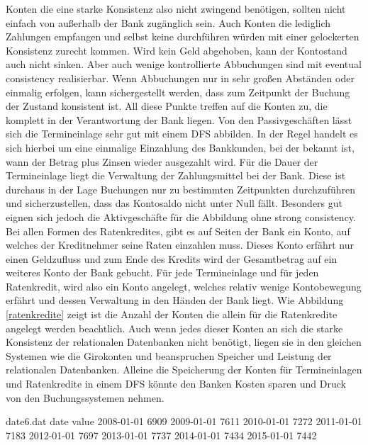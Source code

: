 \documentclass[12pt,oneside,a4paper,parskip]{scrbook}
\begin{document}
Konten die eine starke Konsistenz also nicht zwingend benötigen, sollten nicht einfach von außerhalb der Bank zugänglich sein. Auch Konten die lediglich Zahlungen empfangen und selbst keine durchführen würden mit einer gelockerten Konsistenz zurecht kommen. Wird kein Geld abgehoben, kann der Kontostand auch nicht sinken. Aber auch wenige kontrollierte Abbuchungen sind mit eventual consistency realisierbar. Wenn Abbuchungen nur in sehr großen Abständen oder einmalig erfolgen, kann sichergestellt werden, dass zum Zeitpunkt der Buchung der Zustand konsistent ist. All diese Punkte treffen auf die Konten zu, die komplett in der Verantwortung der Bank liegen. Von den Passivgeschäften lässt sich die Termineinlage sehr gut mit einem DFS abbilden. In der Regel handelt es sich hierbei um eine einmalige Einzahlung des Bankkunden, bei der bekannt ist, wann der Betrag plus Zinsen wieder ausgezahlt wird. Für die Dauer der Termineinlage liegt die Verwaltung der Zahlungsmittel bei der Bank. Diese ist durchaus in der Lage Buchungen nur zu bestimmten Zeitpunkten durchzuführen und sicherzustellen, dass das Kontosaldo nicht unter Null fällt. Besonders gut eignen sich jedoch die Aktivgeschäfte für die Abbildung ohne strong consistency. Bei allen Formen des Ratenkredites, gibt es auf Seiten der Bank ein Konto, auf welches der Kreditnehmer seine Raten einzahlen muss. Dieses Konto erfährt nur einen Geldzufluss und zum Ende des Kredits wird der Gesamtbetrag auf ein weiteres Konto der Bank gebucht. Für jede Termineinlage und für jeden Ratenkredit, wird also ein Konto angelegt, welches relativ wenige Kontobewegung erfährt und dessen Verwaltung in den Händen der Bank liegt. Wie Abbildung \ref{ratenkredite} zeigt ist die Anzahl der Konten die allein für die Ratenkredite angelegt werden beachtlich. Auch wenn jedes dieser Konten an sich die starke Konsistenz der relationalen Datenbanken nicht benötigt, liegen sie in den gleichen Systemen wie die Girokonten und beanspruchen Speicher und Leistung der relationalen Datenbanken. Alleine die Speicherung der Konten für Termineinlagen und Ratenkredite in einem DFS könnte den Banken Kosten sparen und Druck von den Buchungssystemen nehmen.

\begin{filecontents}{date6.dat}
date       value
2008-01-01  6909
2009-01-01  7611
2010-01-01  7272
2011-01-01  7183
2012-01-01  7697
2013-01-01  7737
2014-01-01  7434
2015-01-01  7442
\end{filecontents}
\end{document}
